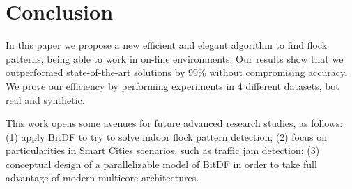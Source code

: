 \chapter{Conclusion}
\label{chp:conclusion}
In this paper we propose a new efficient and elegant algorithm to find flock patterns, being able to work in on-line
environments.  Our results show that we outperformed state-of-the-art solutions by 99\% without compromising accuracy.
We prove our efficiency by performing experiments in 4 different datasets, bot real and synthetic.

This work opens some avenues for future advanced research studies, as follows: (1) apply BitDF to try to solve indoor
flock pattern detection; (2) focus on particularities in Smart Cities scenarios, such as traffic jam detection; (3)
conceptual design of a parallelizable model of BitDF in order to take full advantage of modern multicore architectures.
